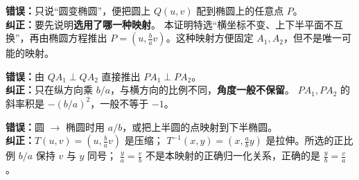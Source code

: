 \begin{trapbox}
\begin{description}[style=nextline,leftmargin=2.8em,labelsep=0.5em,itemsep=0.4em]
  \textbf{错误：}只说“圆变椭圆”，便把圆上 $Q(u,v)$ 配到椭圆上的任意点 $P$。\\
  \textbf{纠正：}要先说明\textbf{选用了哪一种映射}。
  本证明特选“横坐标不变、上下半平面不互换”，再由椭圆方程推出
  $P=(u,\frac ba v)$。这种映射方便固定 $A_1,A_2$，但不是唯一可能的映射。
 \item[\textbf{\textcolor{CTrap}{陷阱 10：把纵向压缩当作等比缩放，认为直角还在}}]
  \textbf{错误：}由 $QA_1\perp QA_2$ 直接推出 $PA_1\perp PA_2$。\\
  \textbf{纠正：}只在纵方向乘 $b/a$，与横方向的比例不同，\textbf{角度一般不保留}。
  $PA_1,PA_2$ 的斜率积是 $-(b/a)^2$，一般不等于 $-1$。
 \item[\textbf{\textcolor{CTrap}{陷阱 11：弄反映射或不注意上下符号}}]
  \textbf{错误：}圆 $\to$ 椭圆时用 $a/b$，或把上半圆的点映射到下半椭圆。\\
  \textbf{纠正：}$T(u,v)=(u,\frac ba v)$ 是压缩；
  $T^{-1}(x,y)=(x,\frac ab y)$ 是拉伸。所选的正比例 $b/a$ 保持 $v$ 与 $y$ 同号；
  $\frac ya=\frac vb$ 不是本映射的正确归一化关系，正确的是 $\boxed{\frac yb=\frac va}$。
\end{description}
\end{trapbox}

